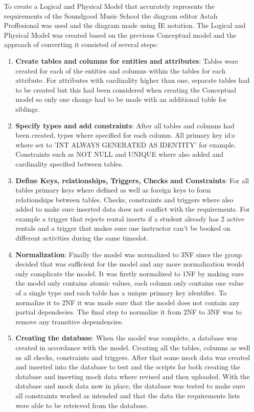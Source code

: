 \documentclass[a4paper]{scrartcl}
\begin{document}
To create a Logical and Physical Model that accurately represents the requirements of the Soundgood Music School the diagram editor Astah Proffesional was used and the diagram made using IE notation. The Logical and Physical Model was created based on the previous Conceptual model and the approach  of converting it consisted of several steps:

\begin{enumerate}
    \item \textbf{Create tables and columns for entities and attributes}:
  Tables were created for each of the entities and columns within the tables for each attribute. For attributes with cardinality higher than one, separate tables had to be created but this had been considered when creating the Conceptual model so only one change had to be made with an additional table for siblings.

    \item \textbf{Specify types and add constraints}:
  After all tables and columns had been created, types where specified for each column. All primary key id:s where set to 'INT ALWAYS GENERATED AS IDENTITY' for example. Constraints such as NOT NULL and UNIQUE where also added and cardinality specified between tables.

    \item \textbf{Define Keys, relationships, Triggers, Checks and Constraints}:
  For all tables primary keys where defined as well as foreign keys to form relationships between tables. Checks, constraints and triggers where also added to make sure inserted data does not conflict with the requirements. For example a trigger that rejects rental inserts if a student already has 2 active rentals and a trigger that makes sure one instructor can't be booked on different activities during the same timeslot.

    \item \textbf{Normalization}:
  Finally the model was normalized to 3NF since the group decided that was sufficient for the model and any more normalization would only complicate the model. It was firstly normalized to 1NF by making sure the model only contains atomic values, each column only contains one value of a single type and each table has a unique primary key identifier. To normalize it to 2NF it was made sure that the model does not contain any partial dependecies. The final step to normalize it from 2NF to 3NF was to remove any transitive dependencies.

    \item \textbf{Creating the database}:
  When the model was complete, a database was created in accordance with the model. Creating all the tables, columns as well as all checks, constraints and triggers. After that some mock data was created and inserted into the database to test and the scripts for both creating the database and inserting mock data where revised and then uploaded. With the database and mock data now in place, the database was tested to make sure all constraints worked as intended and that the data the requirements lists were able to be retrieved from the database.

\end{enumerate}
\end{document}
